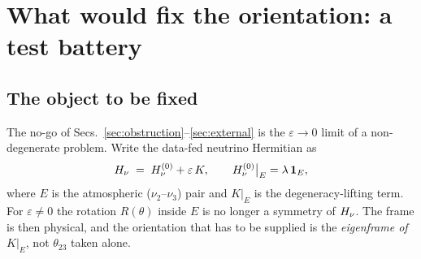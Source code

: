 
\section{What would fix the orientation: a test battery}\label{sec:constructive}

\subsection{The object to be fixed}\label{sec:object}
The no-go of Secs.~\ref{sec:obstruction}--\ref{sec:external} is the $\varepsilon\to0$ limit
of a non-degenerate problem. Write the data-fed neutrino Hermitian as
\begin{equation}\label{eq:epsilon-split}
  H_\nu \;=\; H_\nu^{(0)} + \varepsilon\,K,\qquad
  H_\nu^{(0)}\big|_{E}=\lambda\,\mathbf 1_E ,
\end{equation}
where $E$ is the atmospheric ($\nu_2$--$\nu_3$) pair and $K|_E$ is the degeneracy-lifting
term. For $\varepsilon\neq0$ the rotation $R(\theta)$ inside $E$ is no longer a symmetry of
$H_\nu$. The frame is then physical, and the orientation that has to be supplied is the
\emph{eigenframe of $K|_E$}, not $\theta_{23}$ taken alone.

